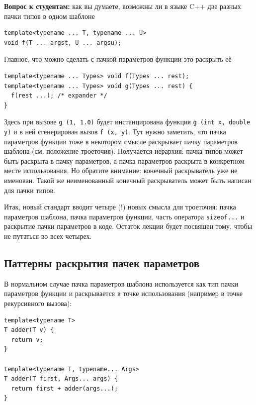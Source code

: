 \documentclass[a4paper,12pt,oneside]{book}
\newif\ifanswers
\begin{document}
\textbf{Вопрос к студентам:} как вы думаете, возможны ли в языке C++ две разных пачки типов в одном шаблоне

\begin{lstlisting}
template<typename ... T, typename ... U>
void f(T ... argst, U ... argsu);
\end{lstlisting}

\ifanswers
Правильный ответ: нет, это ошибка, их нельзя различить во время исполнения.
\fi

Главное, что можно сделать с пачкой параметров функции это раскрыть её

\begin{lstlisting}
template<typename ... Types> void f(Types ... rest);
template<typename ... Types> void g(Types ... rest) {
  f(rest ...); /* expander */
}
\end{lstlisting}

Здесь при вызове \lstinline!g (1, 1.0)! будет инстанцирована функция \lstinline!g (int x, double y)! и в ней сгенерирован вызов \lstinline!f (x, y)!. Тут нужно заметить, что пачка параметров функции тоже в некотором смысле раскрывает пачку параметров шаблона (см. положение троеточия). Получается иерархия: пачка типов может быть раскрыта в пачку параметров, а пачка параметров раскрыта в конкретном месте использования. Но обратите внимание: конечный раскрыватель уже не именован. Такой же неименованный конечный раскрыватель может быть написан для пачки типов.

Итак, новый стандарт вводит четыре (!) новых смысла для троеточия: пачка параметров шаблона, пачка параметров функции, часть оператора \lstinline!sizeof...! и раскрытие пачки параметров в коде. Остаток лекции будет посвящен тому, чтобы не путаться во всех четырех.

\subsection{Паттерны раскрытия пачек параметров}

В нормальном случае пачка параметров шаблона используется как тип пачки параметров функции и раскрывается в точке использования (например в точке рекурсивного вызова):

\begin{lstlisting}
template<typename T>
T adder(T v) {
  return v;
}

template<typename T, typename... Args>
T adder(T first, Args... args) {
  return first + adder(args...);
}
\end{lstlisting}
\end{document}
